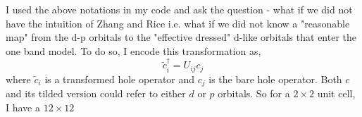 \documentclass[prl,12pt,onecolumn,nofootinbib,notitlepage,english,superscriptaddress]{revtex4-1}
\newcommand{\HJC}[1]{{\color{RED}{\bf HJC: #1}}}
\begin{document}
%
\HJC{How do we think of the problem...? effective d orbitals.... explain associated Figure}
\HJC{Lot of stuff needs to be taken out or re-explained....}
I used the above notations in my code and ask the question
- what if we did not have the intuition of Zhang and Rice i.e.
what if we did not know a "reasonable map" from the d-p
orbitals to the "effective dressed" d-like orbitals that enter the
one band model.
To do so, I encode this transformation as,
\begin{equation}
	\tilde{c}_i^{\dagger} = U_{ij} c_j
\end{equation}
where $\tilde{c}_i$ is a transformed hole operator and $c_j$ is the bare hole
operator. Both $c$ and its tilded version could refer to either
$d$ or $p$ orbitals. So for a $2\times2$ unit cell, I have a $12\times12$
\end{document}
